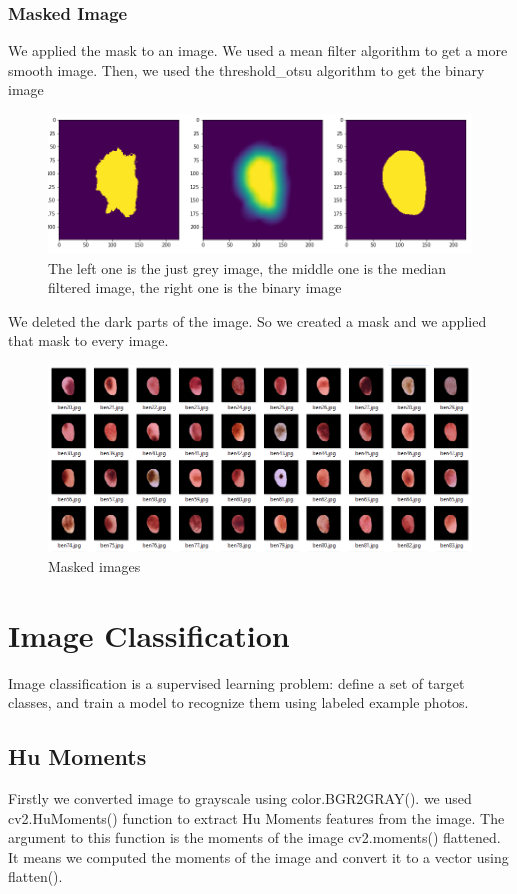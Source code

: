 \documentclass[onecolumn]{article}
\begin{document}
\subsubsection{Masked Image}
We applied the mask to an image. We used a mean filter algorithm to get a more smooth image. Then, we used the threshold\_otsu algorithm to get the binary image 

\begin{figure}[H]
\centering
  \includegraphics[scale=0.45]{images/median_filter, binary.png}
  \caption{The left one is the just grey image, the middle one is the median filtered image, the right one is the binary image
}
  \label{fig:5}
\end{figure}

We deleted the dark parts of the image. So we created a mask and we applied that mask to every image.

\begin{figure}[H]
\centering
  \includegraphics[scale=0.55]{images/masked.PNG}
  \caption{Masked images}
  \label{fig:5}
\end{figure}

\section{Image Classification}
Image classification is a supervised learning problem: define a set of target classes, and train a model to recognize them using labeled example photos.


\subsection{Hu Moments}
Firstly we converted image to grayscale using color.BGR2GRAY().
we used cv2.HuMoments() function to extract Hu Moments features from the image. The argument to this function is the moments of the image cv2.moments() flattened. It means we computed the moments of the image and convert it to a vector using flatten().
\end{document}

